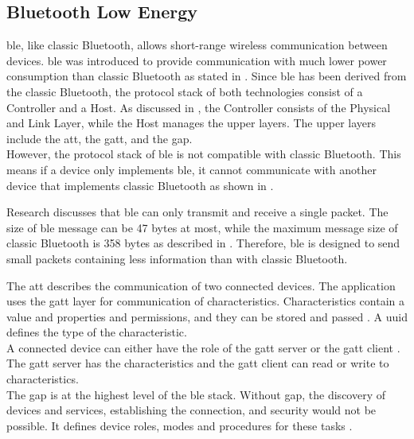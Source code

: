 \subsection{Bluetooth Low Energy}
\gls{ble}, like classic Bluetooth, allows short-range wireless communication between devices. \gls{ble} was introduced to provide communication with much lower power consumption than classic Bluetooth as stated in \cite{GomezOP12}. Since \gls{ble} has been derived from the classic Bluetooth, the protocol stack of both technologies consist of a Controller and a Host. As discussed in \cite{GomezOP12}, the Controller consists of the Physical and Link Layer, while the Host manages the upper layers. The upper layers include the \gls{att}, the \gls{gatt}, and the \gls{gap}. \\
However, the protocol stack of \gls{ble} is not compatible with classic Bluetooth. This means if a device only implements \gls{ble}, it cannot communicate with another device that implements classic Bluetooth as shown in \cite{GomezOP12}.

Research \cite{Ryan13} discusses that \gls{ble} can only transmit and receive a single packet. The size of \gls{ble} message can be 47 bytes at most, while the maximum message size of classic Bluetooth is 358 bytes as described in \cite{GomezOP12}. Therefore, \gls{ble} is designed to send small packets containing less information than with classic Bluetooth.

The \gls{att} describes the communication of two connected devices. The application uses the \gls{gatt} layer for communication of characteristics. Characteristics contain a value and properties and permissions, and they can be stored and passed \cite{BTGatt}. A \gls{uuid} defines the type of the characteristic. \\
A connected device can either have the role of the \gls{gatt} server or the \gls{gatt} client \cite{TIGatt}. The \gls{gatt} server has the characteristics and the \gls{gatt} client can read or write to characteristics. \\
The \gls{gap} is at the highest level of the \gls{ble} stack. Without \gls{gap}, the discovery of devices and services, establishing the connection, and security would not be possible. It defines device roles, modes and procedures for these tasks \cite{GomezOP12}.


